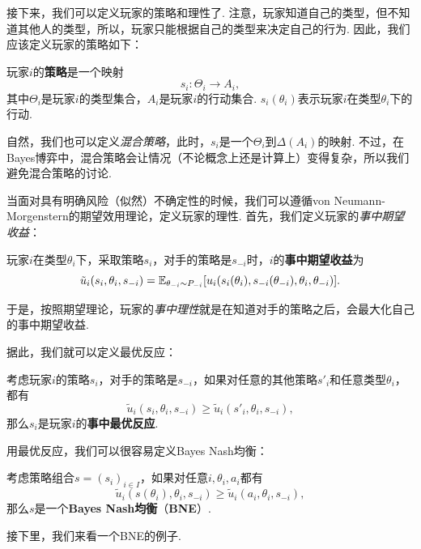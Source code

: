 接下来，我们可以定义玩家的策略和理性了. 注意，玩家知道自己的类型，但不知道其他人的类型，所以，玩家只能根据自己的类型来决定自己的行为. 因此，我们应该定义玩家的策略如下：

\begin{definition}[策略]
    玩家$i$的\textbf{策略}是一个映射
    \[s_i:\Theta_i\to A_i,\]
    其中$\Theta_i$是玩家$i$的类型集合，$A_i$是玩家$i$的行动集合. $s_i(\theta_i)$表示玩家$i$在类型$\theta_i$下的行动.
\end{definition}

\begin{remark}
    自然，我们也可以定义\textit{混合策略}，此时，$s_i$是一个$\Theta_i$到$\Delta(A_i)$的映射. 不过，在Bayes博弈中，混合策略会让情况（不论概念上还是计算上）变得复杂，所以我们避免混合策略的讨论.
\end{remark}

当面对具有明确风险（似然）不确定性的时候，我们可以遵循von Neumann-Morgenstern的期望效用理论，定义玩家的理性. 首先，我们定义玩家的\textit{事中期望收益}：

\begin{definition}[事中期望收益]
    玩家$i$在类型$\theta_i$下，采取策略$s_i$，对手的策略是$s_{-i}$时，$i$的\textbf{事中期望收益}为
    \[\tilde u_i(s_i,\theta_i,s_{-i})=\mathbb{E}_{\theta_{-i}\sim P_{-i}}[u_i(s_i(\theta_i),s_{-i}(\theta_{-i}),\theta_i,\theta_{-i})].\]
\end{definition}

于是，按照期望理论，玩家的\textit{事中理性}就是在知道对手的策略之后，会最大化自己的事中期望收益. 

据此，我们就可以定义最优反应：

\begin{definition}[事中最优反应]
    考虑玩家$i$的策略$s_i$，对手的策略是$s_{-i}$，如果对任意的其他策略$s'_i$和任意类型$\theta_i$，都有
    \[\tilde u_i(s_i,\theta_i,s_{-i})\geq \tilde u_i(s'_i,\theta_i,s_{-i}),\]
    那么$s_i$是玩家$i$的\textbf{事中最优反应}.
\end{definition}

用最优反应，我们可以很容易定义Bayes Nash均衡：

\begin{definition}
    考虑策略组合$s=(s_i)_{i\in I}$，如果对任意$i,\theta_i,a_i$都有
    \[\tilde u_i(s(\theta_i),\theta_i,s_{-i})\geq \tilde u_i(a_i,\theta_i,s_{-i}),\]
    那么$s$是一个\textbf{Bayes Nash均衡}（\textbf{BNE}）.
\end{definition}

接下里，我们来看一个BNE的例子. 

